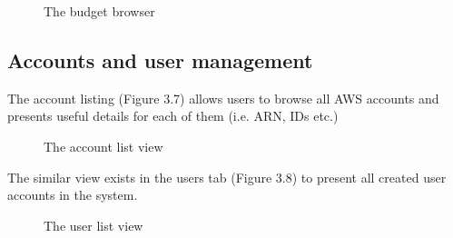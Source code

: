 \documentclass[licencjacka,en]{thesisclass}
\begin{document}
    \begin{figure}[!htbp]
      \caption{The budget browser\label{fig:scr-budget-browse}}
    \end{figure}
    
    \subsection{Accounts and user management}
    
    The account listing (Figure 3.7) allows users to browse all AWS accounts
    and presents useful details for each of them (i.e. ARN, IDs etc.)
    
    \begin{figure}[!htbp]
      \caption{The account list view\label{fig:scr-account-browse}}
    \end{figure}
    
    The similar view exists in the users tab (Figure 3.8) to present all created user accounts in the system.
    
    \begin{figure}[!htbp]
      \caption{The user list view\label{fig:scr-user-browse}}
    \end{figure}
    
\end{document}
